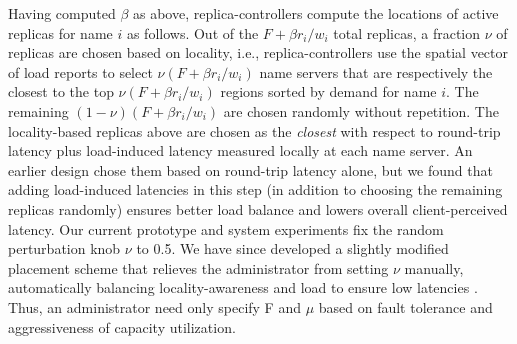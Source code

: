 {	Having computed $\beta$ as above, replica-controllers compute the locations of active replicas for name $i$ as follows. Out of the $F + \beta r_i/w_i$ total replicas, a fraction $\nu$ of replicas are chosen based on locality, i.e., replica-controllers use the spatial vector of load reports to select $\nu(F + \beta r_i/w_i)$ name servers that are respectively the {closest} to the top $\nu(F + \beta r_i/w_i)$ regions sorted by demand for name $i$. The remaining $(1-\nu)(F + \beta r_i/w_i)$  are chosen randomly without repetition. The locality-based replicas above are chosen as the {\em closest} with respect to round-trip latency plus load-induced latency measured locally at each name server. An earlier design chose them based on round-trip latency alone, but we found that adding load-induced latencies in this step (in addition to choosing the remaining replicas randomly) ensures better load balance and lowers overall client-perceived latency.
	Our current prototype and system experiments fix the random perturbation knob $\nu$ to 0.5. We have since developed a slightly modified placement scheme that relieves the administrator from setting $\nu$ manually, automatically balancing locality-awareness and load to ensure low latencies \cite{techreport}. Thus, an administrator need only specify F and $\mu$ based on fault tolerance and aggressiveness of capacity utilization.
	
	
	
}

